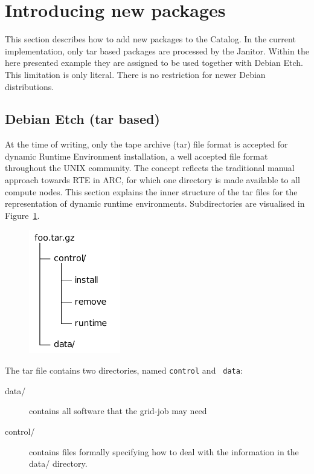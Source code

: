 \section{Introducing new packages}\label{sec:introducing_new_packages}

This section describes how to add new packages to the Catalog. In
the current implementation, only tar based packages are processed by
the Janitor.  Within the here presented example they are assigned to
be used together with Debian Etch. This limitation is only literal.
There is no restriction for newer Debian distributions.

\subsection{Debian Etch (tar based)}

At the time of writing, only the tape archive (tar) file format is
accepted for dynamic Runtime Environment installation, a well accepted
file format throughout the UNIX community.
The concept reflects the
traditional manual approach towards RTE in ARC, for which one directory
is made available to all compute nodes.
This section explains the inner structure of the tar files for the
representation of dynamic runtime environments.  Subdirectories are
visualised in Figure~\ref{fig:tar_folder}.

\begin{figure}
  \begin{center}
    \includegraphics[width=4cm]{images/tar_folder.pdf}
    \label{fig:tar_folder}
  \end{center}
\end{figure}

The tar file contains two directories, named {\tt control} and {\tt
data}:

\begin{description}
\item [data/] contains all software that the grid-job may need
\item [control/] contains files formally specifying how to deal
	with the information in the data/ directory.
\end{description}

